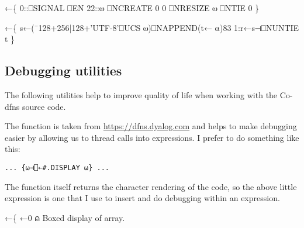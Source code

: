 \documentclass{article}%
\begin{document}
\nwenddocs{}\endmoddef\nwstartdeflinemarkup{}\nwenddeflinemarkup
{}←\{
  0::⎕SIGNAL ⎕EN
  22::⍵ ⎕NCREATE 0
  0 ⎕NRESIZE ⍵ ⎕NTIE 0
\}

←\{
  s←(¯128+256|128+'UTF-8'⎕UCS ⍵)⎕NAPPEND(t← ⍺)83
  1:r←s⊣⎕NUNTIE t
\}
\eatline
{}\nwendcode{}\nwdocspar

\subsection{Debugging utilities}

The following utilities help to improve quality of life when working 
with the Co-dfns source code. 

The {\Tt{}\nwendquote} function is taken from \url{https://dfns.dyalog.com} 
and helps to make debugging easier by allowing us to thread 
{\Tt{}\nwendquote} calls into expressions. I prefer to do something like 
this:

\begin{verbatim}
... {⍵⊣⎕←#.DISPLAY ⍵} ...
\end{verbatim}

\noindent
The function itself returns the character rendering of the code,
so the above little expression is one that I use to insert and do 
debugging within an expression.

\nwenddocs{}\endmoddef\nwstartdeflinemarkup\nwenddeflinemarkup
{}←\{ ←0                      ⍝ Boxed display of array.
                                                                                  
\end{document}
